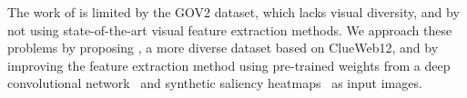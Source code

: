 The work of \citet{fan2017learning} is limited by the GOV2 dataset, which lacks visual diversity, and by not using state-of-the-art visual feature extraction methods.
We approach these problems by proposing \datasetname, a more diverse dataset based on ClueWeb12, and by improving the feature extraction method using
pre-trained weights from a deep convolutional network~\cite{simonyan2014very} and 
synthetic saliency heatmaps~\cite{shan2017two} as input images.






